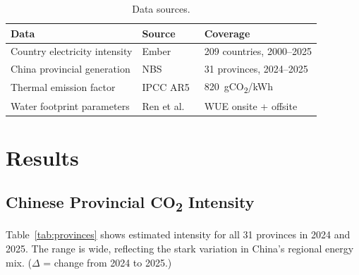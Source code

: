 \documentclass[11pt,a4paper]{article}
\begin{document}
\begin{table}[h]
\centering
\renewcommand{\arraystretch}{1.2}
\begin{tabular}{lll}
\toprule
Data & Source & Coverage \\
\midrule
Country electricity intensity   & Ember~\cite{ember}      & 209 countries, 2000--2025 \\
China provincial generation     & NBS~\cite{nbs}          & 31 provinces, 2024--2025 \\
Thermal emission factor         & IPCC AR5~\cite{ipcc2014}& 820~gCO\textsubscript{2}/kWh \\
Water footprint parameters      & Ren et al.~\cite{ren2025} & WUE onsite + offsite \\
\bottomrule
\end{tabular}
\vspace{4pt}
\caption{Data sources.}
\end{table}

\section{Results}

\subsection{Chinese Provincial CO\textsubscript{2} Intensity}

Table~\ref{tab:provinces} shows estimated intensity for all 31 provinces in
2024 and 2025. The range is wide, reflecting the stark variation in China's
regional energy mix. ($\Delta$ = change from 2024 to 2025.)
\end{document}
